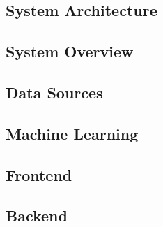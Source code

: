 \subsection{System Architecture}


\subsection{System Overview}


\subsection{Data Sources}\label{data-sources}


\subsection{Machine Learning}\label{machine-learning}


\subsection{Frontend}\label{frontend}


\subsection{Backend}\label{backend}
